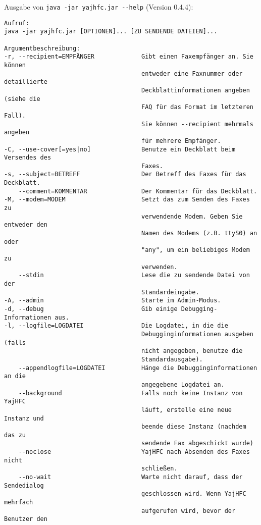 \documentclass[a4paper,10pt,halfparskip,noparindent]{scrartcl}
\begin{document}
Ausgabe von \verb#java -jar yajhfc.jar --help# (Version 0.4.4):
\begin{verbatim}
Aufruf:
java -jar yajhfc.jar [OPTIONEN]... [ZU SENDENDE DATEIEN]...

Argumentbeschreibung:
-r, --recipient=EMPFÄNGER             Gibt einen Faxempfänger an. Sie können
                                      entweder eine Faxnummer oder detaillierte
                                      Deckblattinformationen angeben (siehe die
                                      FAQ für das Format im letzteren Fall).
                                      Sie können --recipient mehrmals angeben
                                      für mehrere Empfänger.
-C, --use-cover[=yes|no]              Benutze ein Deckblatt beim Versendes des
                                      Faxes.
-s, --subject=BETREFF                 Der Betreff des Faxes für das Deckblatt.
    --comment=KOMMENTAR               Der Kommentar für das Deckblatt.
-M, --modem=MODEM                     Setzt das zum Senden des Faxes zu
                                      verwendende Modem. Geben Sie entweder den
                                      Namen des Modems (z.B. ttyS0) an oder
                                      "any", um ein beliebiges Modem zu
                                      verwenden.
    --stdin                           Lese die zu sendende Datei von der
                                      Standardeingabe.
-A, --admin                           Starte im Admin-Modus.
-d, --debug                           Gib einige Debugging-Informationen aus.
-l, --logfile=LOGDATEI                Die Logdatei, in die die
                                      Debugginginformationen ausgeben (falls
                                      nicht angegeben, benutze die
                                      Standardausgabe).
    --appendlogfile=LOGDATEI          Hänge die Debugginginformationen an die
                                      angegebene Logdatei an.
    --background                      Falls noch keine Instanz von YajHFC
                                      läuft, erstelle eine neue Instanz und
                                      beende diese Instanz (nachdem das zu
                                      sendende Fax abgeschickt wurde)
    --noclose                         YajHFC nach Absenden des Faxes nicht
                                      schließen.
    --no-wait                         Warte nicht darauf, dass der Sendedialog
                                      geschlossen wird. Wenn YajHFC mehrfach
                                      aufgerufen wird, bevor der Benutzer den

\end{verbatim}
\end{document}
